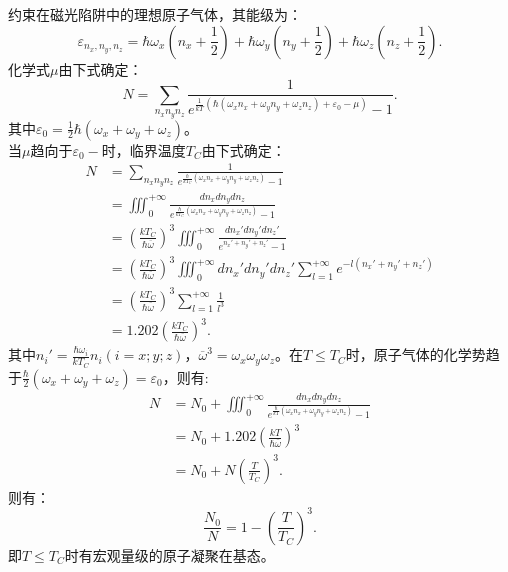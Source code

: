 \documentclass[a4paper,12pt]{article}
\begin{document}
\section{}
约束在磁光陷阱中的理想原子气体，其能级为：
\begin{equation*}
	\varepsilon_{n_x,n_y,n_z} = \hbar\omega_x\left( n_x+\frac{1}{2} \right) + \hbar\omega_y\left( n_y+\frac{1}{2} \right) + \hbar\omega_z\left( n_z+\frac{1}{2} \right).
\end{equation*}
化学式$\mu$由下式确定：
\begin{equation*}
	N = \sum_{n_x n_y n_z} \frac{1}{e^{\frac{1}{kT}\left(\hbar(\omega_xn_x + \omega_yn_y + \omega_zn_z) + \varepsilon_0 - \mu\right)} - 1}.
\end{equation*}
其中$\varepsilon_0 = \frac{1}{2}\hbar(\omega_x+\omega_y+\omega_z)$。 \\
当$\mu$趋向于$\varepsilon_0-$时，临界温度$T_C$由下式确定：
\begin{equation*}
\begin{aligned}
	N &= \sum_{n_x n_y n_z} \frac{1}{e^{\frac{\hbar}{kT_C}(\omega_x n_x + \omega_y n_y + \omega_z n_z)} - 1} \\
	&= \iiint_{0}^{+\infty} \frac{dn_x dn_y dn_z}{e^{\frac{\hbar}{kT_C}(\omega_x n_x + \omega_y n_y + \omega_z n_z)} - 1} \\
	&= \left( \frac{kT_C}{\hbar\overline{\omega}} \right)^3 \iiint_0^{+\infty} \frac{dn_x' dn_y' dn_z'}{e^{n_x' + n_y' + n_z'} - 1} \\
	&= \left( \frac{kT_C}{\hbar\overline{\omega}} \right)^3 \iiint_0^{+\infty} dn_x' dn_y' dn_z'\sum_{l=1}^{+\infty} e^{-l(n_x' + n_y' + n_z')} \\
	&= \left( \frac{kT_C}{\hbar\overline{\omega}} \right)^3 \sum_{l=1}^{+\infty} \frac{1}{l^3} \\
	&= 1.202 \left( \frac{kT_C}{\hbar\overline{\omega}} \right)^3.
\end{aligned}
\end{equation*}
其中$n_i' = \frac{\hbar \omega_i}{kT_C}n_i(i=x;y;z)$，$\overline{\omega}^3 = \omega_x\omega_y\omega_z$。在$T\leq T_C$时，原子气体的化学势趋于$\frac{\hbar}{2}(\omega_x+\omega_y+\omega_z) = \varepsilon_0$，则有:
\begin{equation*}
\begin{aligned}
	N &= N_0 + \iiint_{0}^{+\infty} \frac{dn_x dn_y dn_z}{e^{\frac{\hbar}{kT}(\omega_x n_x + \omega_y n_y + \omega_z n_z)} - 1} \\
	&= N_0 + 1.202 \left( \frac{kT}{\hbar\overline{\omega}} \right)^3 \\
	&= N_0 + N\left( \frac{T}{T_C} \right)^3.
\end{aligned}
\end{equation*}
则有：
\begin{equation*}
	\frac{N_0}{N} = 1 - \left( \frac{T}{T_C} \right)^3.
\end{equation*}
即$T\leq T_C$时有宏观量级的原子凝聚在基态。
\end{document}
